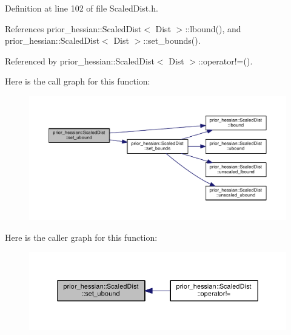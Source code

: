 Definition at line 102 of file Scaled\+Dist.\+h.



References prior\+\_\+hessian\+::\+Scaled\+Dist$<$ Dist $>$\+::lbound(), and prior\+\_\+hessian\+::\+Scaled\+Dist$<$ Dist $>$\+::set\+\_\+bounds().



Referenced by prior\+\_\+hessian\+::\+Scaled\+Dist$<$ Dist $>$\+::operator!=().



Here is the call graph for this function\+:\nopagebreak
\begin{figure}[H]
\begin{center}
\leavevmode
\includegraphics[width=350pt]{classprior__hessian_1_1ScaledDist_ace5188e41adff598f3ed4d5dc8530af0_cgraph}
\end{center}
\end{figure}




Here is the caller graph for this function\+:\nopagebreak
\begin{figure}[H]
\begin{center}
\leavevmode
\includegraphics[width=350pt]{classprior__hessian_1_1ScaledDist_ace5188e41adff598f3ed4d5dc8530af0_icgraph}
\end{center}
\end{figure}


